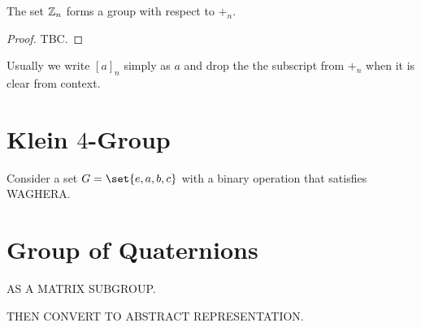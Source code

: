 \documentclass[11pt]{penrose}
\begin{document}
\begin{nthm}
    The set $\mathbb{Z}_n$ forms a group with respect to $+_n$.
\end{nthm}
\begin{proof}
    TBC.
\end{proof}

Usually we write $[a]_n$ simply as $a$ and drop the the subscript from $+_n$ when it is clear from context.

\section{Klein $4$-Group}
Consider a set $G = \set{e, a, b, c}$ with a binary operation that satisfies WAGHERA.

\section{Group of Quaternions}
AS A MATRIX SUBGROUP.

THEN CONVERT TO ABSTRACT REPRESENTATION.
\end{document}
